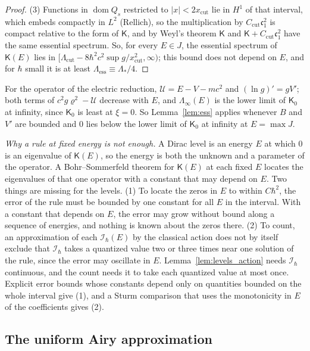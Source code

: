 \documentclass[aps,prd,onecolumn,tightenlines,nofootinbib,notitlepage,11pt,floatfix]{revtex4-2}
\theoremstyle{indentedtheorem}
\begin{document}
\begin{proof}
(3) Functions in $\operatorname{dom}Q_s$ restricted to $|x|<2x_\text{cut}$ lie in $H^1$ of that interval, which embeds compactly in $L^2$ (Rellich), so the multiplication by $C_\text{cut}\mathfrak{c}_1^2$ is compact relative to the form of $\mathsf{K}$, and by Weyl's theorem $\mathsf{K}$ and $\mathsf{K}+C_\text{cut}\mathfrak{c}_1^2$ have the same essential spectrum.
So, for every $E\in J$, the essential spectrum of $\mathsf{K}(E)$ lies in $[\Lambda_\text{cut}-8\hbar^2c^2\sup g/x_\text{cut}^2,\infty)$; this bound does not depend on $E$, and for $\hbar$ small it is at least $\Lambda_\text{ess}\equiv\Lambda_*/4$.
\end{proof}

\noindent For the operator of the electric reduction, $\mathcal{U}=E-V-mc^2$ and $(\ln g)'=gV'$; both terms of $c^2g\varrho^2-\mathcal{U}$ decrease with $E$, and $\Lambda_\infty(E)$ is the lower limit of $\mathsf{K}_0$ at infinity, since $\mathsf{K}_0$ is least at $\xi=0$. So Lemma~\ref{lem:ess} applies whenever $B$ and $V'$ are bounded and $0$ lies below the lower limit of $\mathsf{K}_0$ at infinity at $E=\max J$.

\emph{Why a rule at fixed energy is not enough.} A Dirac level is an energy $E$ at which $0$ is an eigenvalue of $\mathsf{K}(E)$, so the energy is both the unknown and a parameter of the operator. A Bohr--Sommerfeld theorem for $\mathsf{K}(E)$ at each fixed $E$ locates the eigenvalues of that one operator with a constant that may depend on $E$. Two things are missing for the levels. (1) To locate the zeros in $E$ to within $C\hbar^2$, the error of the rule must be bounded by one constant for all $E$ in the interval. With a constant that depends on $E$, the error may grow without bound along a sequence of energies, and nothing is known about the zeros there. (2) To count, an approximation of each $\mathcal{I}_\hbar(E)$ by the classical action does not by itself exclude that $\mathcal{I}_\hbar$ takes a quantized value two or three times near one solution of the rule, since the error may oscillate in $E$. Lemma~\ref{lem:levels_action} needs $\mathcal{I}_\hbar$ continuous, and the count needs it to take each quantized value at most once. Explicit error bounds whose constants depend only on quantities bounded on the whole interval give (1), and a Sturm comparison that uses the monotonicity in $E$ of the coefficients gives (2).

\subsection{The uniform Airy approximation}
\label{sup:airy}
\end{document}

